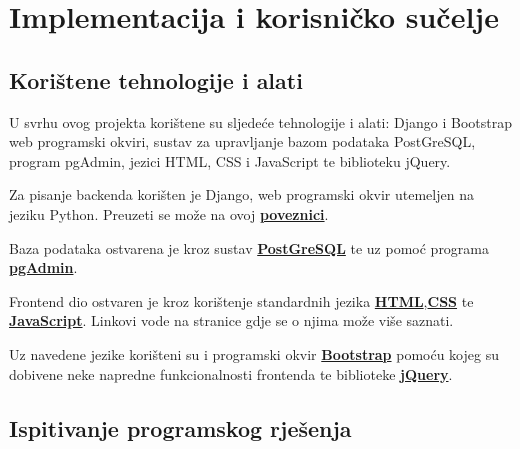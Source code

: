 \chapter{Implementacija i korisničko sučelje}
		
		
		\section{Korištene tehnologije i alati}
		
			 U svrhu ovog projekta korištene su sljedeće tehnologije i alati: Django i Bootstrap web programski okviri, sustav za upravljanje bazom podataka PostGreSQL, program pgAdmin, jezici HTML, CSS i JavaScript te biblioteku jQuery. \\
			 
			 
			 {Za pisanje backenda korišten je Django, web programski okvir utemeljen na jeziku Python. Preuzeti se može na ovoj  \href{https://www.djangoproject.com/}{\textbf{poveznici}}.
			 	
			 Baza podataka ostvarena je kroz sustav \href{https://www.postgresql.org/}{\textbf{PostGreSQL}} te uz pomoć programa \href{https://www.pgadmin.org/}{\textbf{pgAdmin}}.
			 
			 Frontend dio ostvaren je kroz korištenje standardnih jezika \href{https://www.w3schools.com/html/}{\textbf{HTML}},\href{https://www.w3schools.com/css/}{\textbf{CSS}} te \href{https://www.w3schools.com/js/DEFAULT.asp}{\textbf{JavaScript}}. Linkovi vode na stranice gdje se o njima može više saznati. 
			 
			 Uz navedene jezike korišteni su i programski okvir \href{https://getbootstrap.com/}{\textbf{Bootstrap}} pomoću kojeg su dobivene neke napredne funkcionalnosti frontenda te biblioteke \href{https://jquery.com/}{\textbf{jQuery}}.
			
			
			\eject 
		
	
		\section{Ispitivanje programskog rješenja}
			
}
